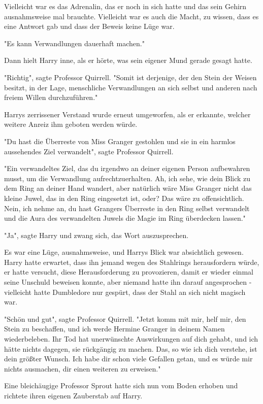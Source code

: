 {Vielleicht war es das Adrenalin, das er noch in sich hatte und das sein Gehirn ausnahmsweise mal brauchte. Vielleicht war es auch die Macht, zu wissen, dass es eine Antwort gab und dass der Beweis keine Lüge war.

"Es kann Verwandlungen dauerhaft machen."

Dann hielt Harry inne, als er hörte, was sein eigener Mund gerade gesagt hatte.

"Richtig", sagte Professor Quirrell. "Somit ist derjenige, der den Stein der Weisen besitzt, in der Lage, menschliche Verwandlungen an sich selbst und anderen nach freiem Willen durchzuführen."

Harrys zerrissener Verstand wurde erneut umgeworfen, als er erkannte, welcher weitere Anreiz ihm geboten werden würde.

"Du hast die Überreste von Miss Granger gestohlen und sie in ein harmlos aussehendes Ziel verwandelt", sagte Professor Quirrell.

"Ein verwandeltes Ziel, das du irgendwo an deiner eigenen Person aufbewahren musst, um die Verwandlung aufrechtzuerhalten. Ah, ich sehe, wie dein Blick zu dem Ring an deiner Hand wandert, aber natürlich wäre Miss Granger nicht das kleine Juwel, das in den Ring eingesetzt ist, oder? Das wäre zu offensichtlich. Nein, ich nehme an, du hast Grangers Überreste in den Ring selbst verwandelt und die Aura des verwandelten Juwels die Magie im Ring überdecken lassen."

"Ja", sagte Harry und zwang sich, das Wort auszusprechen.

Es war eine Lüge, ausnahmsweise, und Harrys Blick war absichtlich gewesen. Harry hatte erwartet, dass ihn jemand wegen des Stahlrings herausfordern würde, er hatte versucht, diese Herausforderung zu provozieren, damit er wieder einmal seine Unschuld beweisen konnte, aber niemand hatte ihn darauf angesprochen - vielleicht hatte Dumbledore nur gespürt, dass der Stahl an sich nicht magisch war.

"Schön und gut", sagte Professor Quirrell. "Jetzt komm mit mir, helf mir, den Stein zu beschaffen, und ich werde Hermine Granger in deinem Namen wiederbeleben. Ihr Tod hat unerwünschte Auswirkungen auf dich gehabt, und ich hätte nichts dagegen, sie rückgängig zu machen. Das, so wie ich dich verstehe, ist dein größter Wunsch. Ich habe dir schon viele Gefallen getan, und es würde mir nichts ausmachen, dir einen weiteren zu erweisen."

Eine bleichäugige Professor Sprout hatte sich nun vom Boden erhoben und richtete ihren eigenen Zauberstab auf Harry.

}
